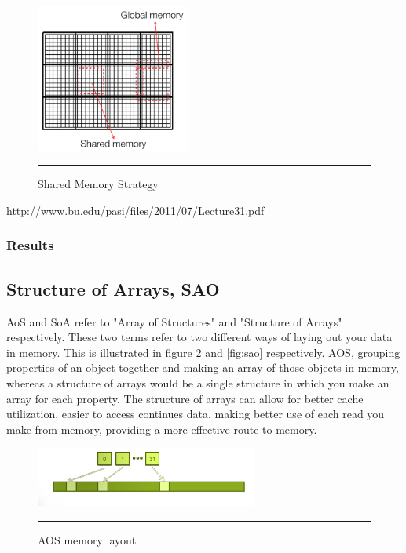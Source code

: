 \begin{figure}[htbp]
	\centering
		\includegraphics[width=0.45\textwidth]{Figures/shared.png}
		\rule{35em}{0.2pt}
	\caption[Shared Memory Strategy]{Shared Memory Strategy }
	\label{fig:shared}
\end{figure}

http://www.bu.edu/pasi/files/2011/07/Lecture31.pdf


\subsubsection{Results}


\subsection{Structure of Arrays, SAO}


AoS and SoA refer to "Array of Structures" and "Structure of Arrays" respectively. These two terms refer to two different ways of laying out your data in memory. This is illustrated in figure \ref{fig:aos} and \ref{fig:sao} respectively. AOS, grouping properties of an object together and making an array of those objects in memory, whereas a structure of arrays would be a single structure in which you make an array for each property. The structure of arrays can allow for better cache utilization, easier to access continues data, making better use of each read you make from memory, providing a more effective route to memory. 

\begin{figure}[htbp]
	\centering
		\includegraphics[width=0.65\textwidth]{Figures/aos.png}
		\rule{35em}{0.2pt}
	\caption[Array of structures (AOS)]{AOS memory layout }
	\label{fig:aos}
\end{figure}


